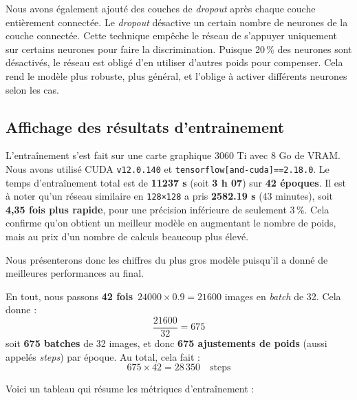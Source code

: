 \documentclass{article}
\begin{document}
Nous avons également ajouté des couches de \emph{dropout} après chaque couche entièrement connectée. Le \emph{dropout} désactive un certain nombre de neurones de la couche connectée. Cette technique empêche le réseau de s’appuyer uniquement sur certains neurones pour faire la discrimination. Puisque 20\,\% des neurones sont désactivés, le réseau est obligé d’en utiliser d’autres poids pour compenser. Cela rend le modèle plus robuste, plus général, et l’oblige à activer différents neurones selon les cas.

\subsection{ Affichage des résultats d’entrainement}

L'entraînement s'est fait sur une carte graphique 3060 Ti avec 8 Go de VRAM. Nous avons utilisé CUDA \texttt{v12.0.140} et \texttt{tensorflow[and-cuda]==2.18.0}. Le temps d'entraînement total est de \textbf{11237 s} (soit \textbf{3 h 07}) sur \textbf{42 époques}.
Il est à noter qu’un réseau similaire en \texttt{128×128} a pris \textbf{2582.19 s} (43 minutes), soit \textbf{4,35 fois plus rapide}, pour une précision inférieure de seulement 3\,\%. Cela confirme qu’on obtient un meilleur modèle en augmentant le nombre de poids, mais au prix d’un nombre de calculs beaucoup plus élevé.

Nous présenterons donc les chiffres du plus gros modèle puisqu’il a donné de meilleures performances au final.

En tout, nous passons \textbf{42 fois} \(\,24000 \times 0.9 = 21600\) images en \emph{batch} de 32.
Cela donne :
\[
\frac{21600}{32} = 675
\]
soit \textbf{675 batches} de 32 images, et donc \textbf{675 ajustements de poids} (aussi appelés \emph{steps}) par époque.
Au total, cela fait :
\[
675 \times 42 = 28\,350 \quad \text{steps}
\]

Voici un tableau qui résume les métriques d'entraînement :
\end{document}
